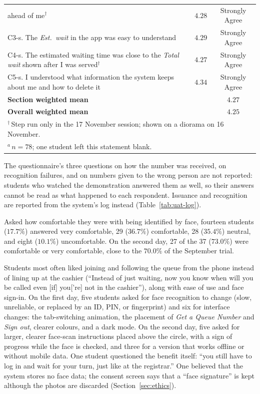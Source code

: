 \documentclass{research}
\begin{document}
\begin{table}[!htbp]
\begin{tabular}{p{}cc}
  ahead of me$^{\dagger}$ & $4.28$ & Strongly Agree \\
C3-s. The \emph{Est.\ wait} in the app was easy to understand
  & $4.29$ & Strongly Agree \\
C4-s. The estimated waiting time was close to the \emph{Total wait}
  shown after I was served$^{\dagger}$ & $4.27$ & Strongly Agree \\
C5-s. I understood what information the system keeps about me and how
  to delete it & $4.34$ & Strongly Agree \\
\hline
\multicolumn{2}{l}{\textbf{Section weighted mean}} & $4.27$ \\
\hline
\multicolumn{2}{l}{\textbf{Overall weighted mean}} & $4.25$ \\
\hline
\multicolumn{3}{l}{\footnotesize $^{\dagger}$\,Step run only in the 17
  November session; shown on a diorama on 16 November.} \\
\multicolumn{3}{l}{\footnotesize $^{a}$\,$n = 78$; one student left this
  statement blank.} \\
\end{tabular}
\end{table}

\label{subsec:uat-issuance}

The questionnaire's three questions on how the number was received, on
recognition failures, and on numbers given to the wrong person are not
reported: students who watched the demonstration answered them as well,
so their answers cannot be read as what happened to each respondent.
Issuance and recognition are reported from the system's log instead
(Table~\ref{tab:uat-log}).

Asked how comfortable they were with being identified by face, fourteen
students ($17.7\%$) answered very comfortable, 29 ($36.7\%$)
comfortable, 28 ($35.4\%$) neutral, and eight ($10.1\%$) uncomfortable.
On the second day, 27 of the 37 ($73.0\%$) were comfortable or very
comfortable, close to the $70.0\%$ of the September trial.

Students most often liked joining and following the queue from the phone
instead of lining up at the cashier (``Instead of just waiting, now you
know when will you be called even [if] you['re] not in the cashier''),
along with ease of use and face sign-in. On the first day, five students
asked for face recognition to change (slow, unreliable, or replaced by an
ID, PIN, or fingerprint) and six for interface changes: the
tab-switching animation, the placement of \emph{Get a Queue Number} and
\emph{Sign out}, clearer colours, and a dark mode. On the second day,
five asked for larger, clearer face-scan instructions placed above the
circle, with a sign of progress while the face is checked, and three for
a version that works offline or without mobile data. One student
questioned the benefit itself: ``you still have to log in and wait for
your turn, just like at the registrar.'' One believed that the system
stores no face data; the consent screen says that a ``face signature'' is
kept although the photos are discarded (Section~\ref{sec:ethics}).
\end{document}
